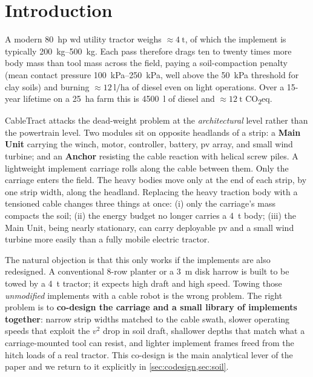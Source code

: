 \documentclass[11pt,a4paper]{article}
\begin{document}
\section{Introduction}\label{sec:intro}

A modern \SI{80}{hp} \gls{wd} utility tractor weighs ${\approx}\SI{4}{\tonne}$, of which the implement is typically \SIrange{200}{500}{\kilogram}. Each pass therefore drags ten to twenty times more body mass than tool mass across the field, paying a soil-compaction penalty (mean contact pressure \SIrange{100}{250}{\kilo\pascal}, well above the \SI{50}{\kilo\pascal} threshold for clay soils) and burning ${\approx}\SI{12}{\litre\per\hectare}$ of diesel even on light operations. Over a 15-year lifetime on a \SI{25}{\hectare} farm this is \SI{4500}{\litre} of diesel and ${\approx}\SI{12}{\tonne}$ CO\textsubscript{2}eq.

CableTract attacks the dead-weight problem at the \emph{architectural} level rather than the powertrain level. Two modules sit on opposite headlands of a strip: a \textbf{Main Unit} carrying the winch, motor, controller, battery, \gls{pv} array, and small wind turbine; and an \textbf{Anchor} resisting the cable reaction with helical screw piles. A lightweight implement carriage rolls along the cable between them. Only the carriage enters the field. The heavy bodies move only at the end of each strip, by one strip width, along the headland. Replacing the heavy traction body with a tensioned cable changes three things at once: (i) only the carriage's mass compacts the soil; (ii) the energy budget no longer carries a \SI{4}{\tonne} body; (iii) the Main Unit, being nearly stationary, can carry deployable \gls{pv} and a small wind turbine more easily than a fully mobile electric tractor.

The natural objection is that this only works if the implements are also redesigned. A conventional 8-row planter or a \SI{3}{\meter} disk harrow is built to be towed by a \SI{4}{\tonne} tractor; it expects high draft and high speed. Towing those \emph{unmodified} implements with a cable robot is the wrong problem. The right problem is to \textbf{co-design the carriage and a small library of implements together}: narrow strip widths matched to the cable swath, slower operating speeds that exploit the $v^2$ drop in soil draft, shallower depths that match what a carriage-mounted tool can resist, and lighter implement frames freed from the hitch loads of a real tractor. This co-design is the main analytical lever of the paper and we return to it explicitly in \cref{sec:codesign,sec:soil}.
\end{document}
